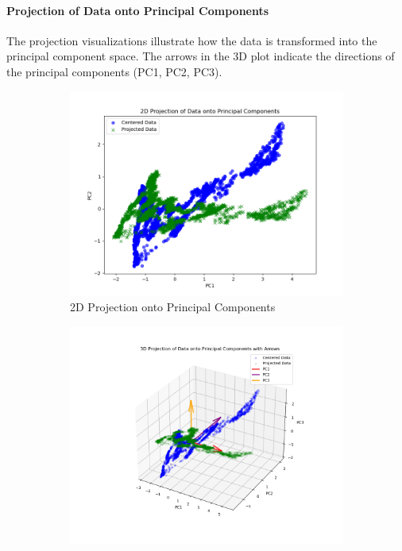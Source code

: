 \documentclass[12pt]{article}
\begin{document}
\paragraph{Projection of Data onto Principal Components}

The projection visualizations illustrate how the data is transformed into the principal component space. The arrows in the 3D plot indicate the directions of the principal components (PC1, PC2, PC3).

\begin{figure}[H]
    \centering
    \begin{subfigure}[b]{0.48\textwidth}
        \centering
        \includegraphics[width=\linewidth]{visuals/2d_projection_visualization.png}
        \caption{2D Projection onto Principal Components}
    \end{subfigure}
    \hfill
    \begin{subfigure}[b]{0.48\textwidth}
        \centering
        \includegraphics[width=\linewidth]{visuals/3d_projection_with_arrows.png}

\end{subfigure}
\end{figure}
\end{document}
